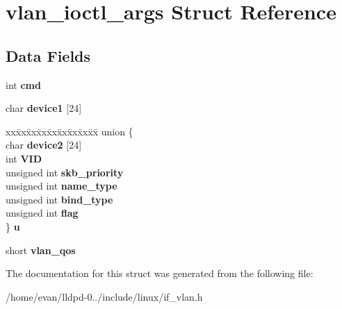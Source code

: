 \section{vlan\-\_\-ioctl\-\_\-args \-Struct \-Reference}
\label{structvlan__ioctl__args}
\subsection*{\-Data \-Fields}
\begin{DoxyCompactItemize}
\item 
int {\bfseries cmd}\label{structvlan__ioctl__args_a85092d82ab6ea85dad51ba78cbda36a0}

\item 
char {\bfseries device1} [24]\label{structvlan__ioctl__args_aa42d405674afcea4249b560f7b7a60d4}

\item 
\begin{tabbing}
xx\=xx\=xx\=xx\=xx\=xx\=xx\=xx\=xx\=\kill
union \{\\
\>char {\bfseries device2} [24]\\
\>int {\bfseries VID}\\
\>unsigned int {\bfseries skb\_priority}\\
\>unsigned int {\bfseries name\_type}\\
\>unsigned int {\bfseries bind\_type}\\
\>unsigned int {\bfseries flag}\\
\} {\bfseries u}\label{structvlan__ioctl__args_ad9631c37cfa4348db38723c896a82ecf}
\\

\end{tabbing}\item 
short {\bfseries vlan\-\_\-qos}\label{structvlan__ioctl__args_acff6d7fca0c611222b485a46a9da28fe}

\end{DoxyCompactItemize}


\-The documentation for this struct was generated from the following file\-:\begin{DoxyCompactItemize}
\item 
/home/evan/lldpd-\/0../include/linux/if\-\_\-vlan.\-h\end{DoxyCompactItemize}
